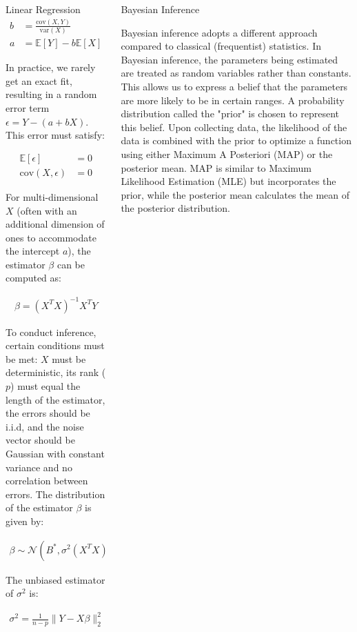 \documentclass{beamer}
\begin{document}
\begin{columns}
\begin{column}{0.3\textwidth}
\begin{block}{Linear Regression}
\begin{align*}
    b &= \frac{\text{cov}(X, Y)}{\text{var}(X)} \\
    a &= \mathbb{E}[Y] - b \mathbb{E}[X]
\end{align*}

In practice, we rarely get an exact fit, resulting in a random error term \(\epsilon = Y - (a + bX)\). This error must satisfy:

\begin{align*}
    \mathbb{E}[\epsilon] &= 0 \\
    \text{cov}(X, \epsilon) &= 0
\end{align*}

For multi-dimensional \(X\) (often with an additional dimension of ones to accommodate the intercept \(a\)), the estimator \(\beta\) can be computed as:

\begin{align*}
    \beta = (X^T X)^{-1} X^T Y
\end{align*}

To conduct inference, certain conditions must be met: \(X\) must be deterministic, its rank (\(p\)) must equal the length of the estimator, the errors should be i.i.d, and the noise vector should be Gaussian with constant variance and no correlation between errors. The distribution of the estimator \(\beta\) is given by:

\begin{align*}
    \beta \sim \mathcal{N}\left(B^*, \sigma^2 (X^T X)^{-1}\right)
\end{align*}

The unbiased estimator of \(\sigma^2\) is:

\begin{align*}
    \sigma^2 = \frac{1}{n-p} \lVert Y - X\beta \rVert_2^2
\end{align*}

\end{block}

\end{column}
\begin{column}{0.3\textwidth}

\begin{block}{Bayesian Inference}

Bayesian inference adopts a different approach compared to classical (frequentist) statistics. In Bayesian inference, the parameters being estimated are treated as random variables rather than constants. This allows us to express a belief that the parameters are more likely to be in certain ranges. A probability distribution called the "prior" is chosen to represent this belief. Upon collecting data, the likelihood of the data is combined with the prior to optimize a function using either Maximum A Posteriori (MAP) or the posterior mean. MAP is similar to Maximum Likelihood Estimation (MLE) but incorporates the prior, while the posterior mean calculates the mean of the posterior distribution.


\end{block}
\end{column}
\end{columns}
\end{document}
